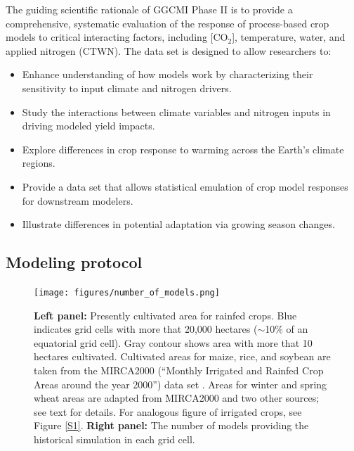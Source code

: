 \documentclass[gmd, manuscript]{copernicus} %
\begin{document}
The guiding scientific rationale of GGCMI Phase II is to provide a comprehensive, systematic evaluation of the response of process-based crop models to critical interacting factors, including [CO$_2$], temperature, water, and applied nitrogen (CTWN). 
The data set is designed to allow researchers to:
\begin{itemize}
    \item Enhance understanding of how models work by characterizing their sensitivity to input climate and nitrogen drivers.
    \item Study the interactions between climate variables and nitrogen inputs in driving modeled yield impacts. 
    \item Explore differences in crop response to warming across the Earth's climate regions.
    \item Provide a data set that allows statistical emulation of crop model responses for downstream modelers.
    \item Illustrate differences in potential adaptation via growing season changes. 
\end{itemize}
\vspace{-0.05in}


\subsection{Modeling protocol}
\begin{figure}[ht]
  \centering
  \texttt{[image: figures/number\_of\_models.png]}
  \caption{\textbf{Left panel:} Presently cultivated area for rainfed crops. Blue indicates grid cells with more that 20,000 hectares ($\sim$10\% of an equatorial grid cell). 
  Gray contour shows area with more that 10 hectares cultivated. Cultivated areas for maize, rice, and soybean are taken from the MIRCA2000 (``Monthly Irrigated and Rainfed Crop Areas around the year 2000'') data set \citep{Portmann2010}. 
  Areas for winter and spring wheat areas are adapted from MIRCA2000 and two other sources; see text for details.  For analogous figure of irrigated crops, see Figure \ref{S1}.
  \textbf{Right panel:} The number of models providing the historical simulation in each grid cell.}
  \label{fig:crop_area}
\end{figure}
\end{document}
